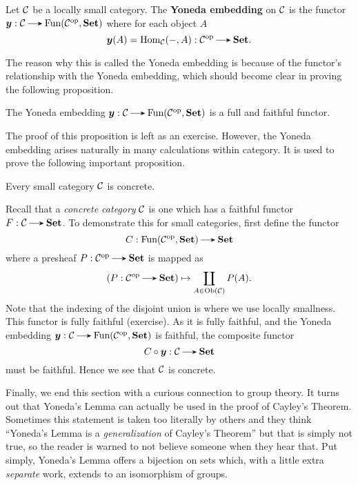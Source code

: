     \begin{definition}
        Let $\mathcal{C}$ be a locally small category. The \textbf{Yoneda embedding} on $\mathcal{C}$ 
        is the functor $\bm{y}: \cc \to \text{Fun}(\cc\op, \textbf{Set})$ where 
        for each object $A$
        \[
            \bm{y}(A) = \hom_{\cc}(-, A): \cc\op \to \textbf{Set}.  
        \]
    \end{definition}
    The reason why this is called the Yoneda embedding is because of the functor's 
    relationship with the Yoneda embedding, which should become clear in proving the 
    following proposition. 

    \begin{proposition}
        The Yoneda embedding $\bm{y}: \cc \to \text{Fun}(\cc\op, \textbf{Set})$
        is a full and faithful functor.
    \end{proposition}
    The proof of this proposition is left as an exercise. However, the Yoneda 
    embedding arises naturally in many calculations within category. It is used 
    to prove the following important proposition. 

    \begin{proposition}
        Every small category $\mathcal{C}$ is concrete. 
    \end{proposition}

    \begin{prf}
        Recall that a \emph{concrete category} $\mathcal{C}$ is one which has a
        faithful functor $F: \cc \to \textbf{Set}$. To demonstrate this 
        for small categories, first define the functor 
        \[
            C: \text{Fun}(\cc\op, \textbf{Set}) \to \textbf{Set}
        \]
        where a presheaf $P: \cc\op \to \textbf{Set}$ is mapped as 
        \[
            (P: \cc\op \to \textbf{Set}) \mapsto \coprod_{A \in \text{Ob}(\cc)} P(A).
        \]
        Note that the indexing of the disjoint union is where we use locally smallness. 
        This functor is fully faithful (exercise). As it is fully faithful, and the Yoneda 
        embedding $\bm{y}: \cc \to \text{Fun}(\cc\op, \textbf{Set})$ is faithful, 
        the composite functor 
        \[
            C \circ \bm{y}: \cc \to \textbf{Set}
        \]
        must be faithful. Hence we see that $\mathcal{C}$ is concrete. 
    \end{prf}
    
    Finally, we end this section with a curious connection to group theory. 
    It turns out that Yoneda's Lemma can actually be used in the proof of Cayley's Theorem.
    Sometimes this statement is taken too literally by others 
    and they think ``Yoneda's Lemma is a \emph{generalization} of 
    Cayley's Theorem'' but that is simply 
    not true, so the reader is warned to not believe someone when they hear that.
    Put simply, Yoneda's Lemma offers a bijection on sets which, with a little extra \emph{separate} 
    work, extends to an isomorphism of groups.

